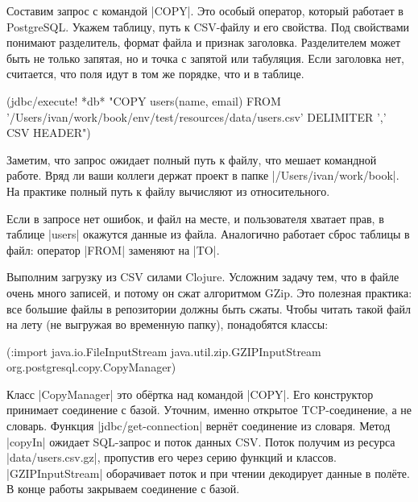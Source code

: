Составим запрос с командой \spverb|COPY|. Это особый оператор, который работает
в PostgreSQL. Укажем таблицу, путь к CSV-файлу и его свойства. Под свойствами
понимают разделитель, формат файла и признак заголовка. Разделителем может быть
не только запятая, но и точка с запятой или табуляция. Если заголовка нет,
считается, что поля идут в том же порядке, что и в таблице.

\begin{english}
  \begin{clojure}
(jdbc/execute! *db*
 "COPY users(name, email)
  FROM '/Users/ivan/work/book/env/test/resources/data/users.csv'
  DELIMITER ',' CSV HEADER")
  \end{clojure}
\end{english}

Заметим, что запрос ожидает полный путь к файлу, что мешает командной
работе. Вряд ли ваши коллеги держат проект в папке
\spverb|/Users/ivan/work/book|. На практике полный путь к файлу вычисляют из
относительного.

Если в запросе нет ошибок, и файл на месте, и пользователя хватает прав, в
таблице \spverb|users| окажутся данные из файла. Аналогично работает сброс
таблицы в файл: оператор \spverb|FROM| заменяют на \spverb|TO|.


Выполним загрузку из CSV силами Clojure. Усложним задачу тем, что в файле очень
много записей, и потому он сжат алгоритмом GZip. Это полезная практика: все
большие файлы в репозитории должны быть сжаты. Чтобы читать такой файл на лету
(не выгружая во временную папку), понадобятся классы:

\begin{english}
  \begin{clojure}
(:import java.io.FileInputStream
         java.util.zip.GZIPInputStream
         org.postgresql.copy.CopyManager)
  \end{clojure}
\end{english}

Класс \spverb|CopyManager| это об\"{е}ртка над командой \spverb|COPY|. Его
конструктор принимает соединение с базой. Уточним, именно открытое
TCP-соединение, а не словарь. Функция \spverb|jdbc/get-connection| верн\"{е}т
соединение из словаря. Метод \spverb|copyIn| ожидает SQL-запрос и поток данных
CSV. Поток получим из ресурса \spverb|data/users.csv.gz|, пропустив его через
серию функций и классов. \spverb|GZIPInputStream| оборачивает поток и при чтении
декодирует данные в пол\"{е}те. В конце работы закрываем соединение с базой.

